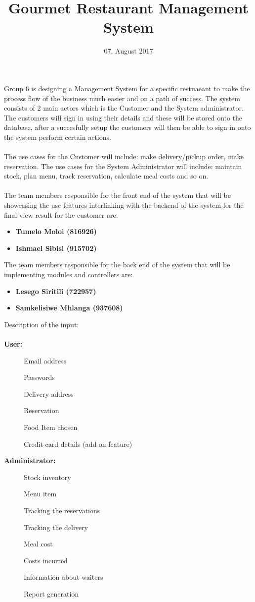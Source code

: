 \documentclass[a4paper,10pt]{article}
\title{Gourmet Restaurant Management System}
\date{07, August 2017}
\begin{document}
\maketitle

Group 6 is designing a Management System for a specific restuaeant to make the process flow of the business much easier and on a path of success. The system consists of 2 main actors which is the Customer and the System administrator. The customers will sign in using their details and these will be stored onto the database, after a succesfully setup the customers will then be able to sign in onto the system perform certain actions. 
\\ \\
The use cases for the Customer will include: make delivery/pickup order, make reservation.
The use cases for the System Administrator will include: maintain stock, plan menu, track reservation, calculate meal costs and so on.
\\ \\
The team members responsible for the front end of the system that will be showcasing the use features interlinking with the backend of the system for the final view result for the customer are: 
\begin{itemize}
	\item \textbf{Tumelo Moloi (816926) }
	\item \textbf{Ishmael Sibisi (915702) }
\end{itemize}
The team members responsible for the back end of the system that will be implementing modules and controllers are: 
\begin{itemize}
	\item \textbf{Lesego Siritili (722957) }
	\item \textbf{Samkelisiwe Mhlanga (937608) }
\end{itemize}
Description of the input:\\ \\
\textbf{User:}
\begin{description}
	\item[] Email address
	\item[] Passwords
	\item[] Delivery address
	\item[] Reservation
	\item[] Food Item chosen
	\item[] Credit card details (add on feature)
\end{description}
\pagebreak
\textbf{Administrator:}
\begin{description}
	\item[] Stock inventory
	\item[] Menu item
	\item[] Tracking the reservations
	\item[] Tracking the delivery
	\item[] Meal cost
	\item[] Costs incurred
	\item[] Information about waiters
	\item[] Report generation
\end{description}
\medskip


%
\end{document}
